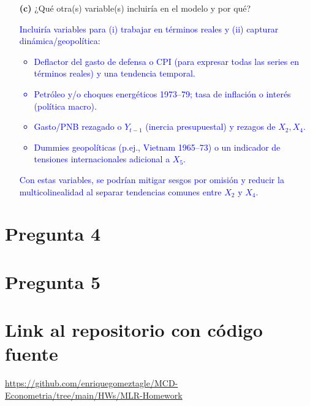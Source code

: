 \documentclass[10pt]{article}
\begin{document}
\begin{enumerate}
    \item[\textbf{(c)}] ¿Qué otra(s) variable(s) incluiría en el modelo y por qué?\\
    \textcolor{blue}{
        Incluiría variables para (i) trabajar en términos reales y (ii) capturar dinámica/geopolítica:
        \begin{itemize}
        \item Deflactor del gasto de defensa o CPI (para expresar todas las series en términos reales) y una tendencia temporal.
        \item Petróleo y/o choques energéticos 1973–79; tasa de inflación o interés (política macro).
        \item Gasto/PNB rezagado o \(Y_{t-1}\) (inercia presupuestal) y rezagos de \(X_2, X_4\).
        \item Dummies geopolíticas (p.ej., Vietnam 1965–73) o un indicador de tensiones internacionales adicional a \(X_5\).
        \end{itemize}
        Con estas variables, se podrían mitigar sesgos por omisión y reducir la multicolinealidad al separar tendencias comunes entre \(X_2\) y \(X_4\).
    }
\end{enumerate}
\section{Pregunta 4}
\section{Pregunta 5}
\section{Link al repositorio con código fuente}
\url{https://github.com/enriquegomeztagle/MCD-Econometria/tree/main/HWs/MLR-Homework}
\end{document}
